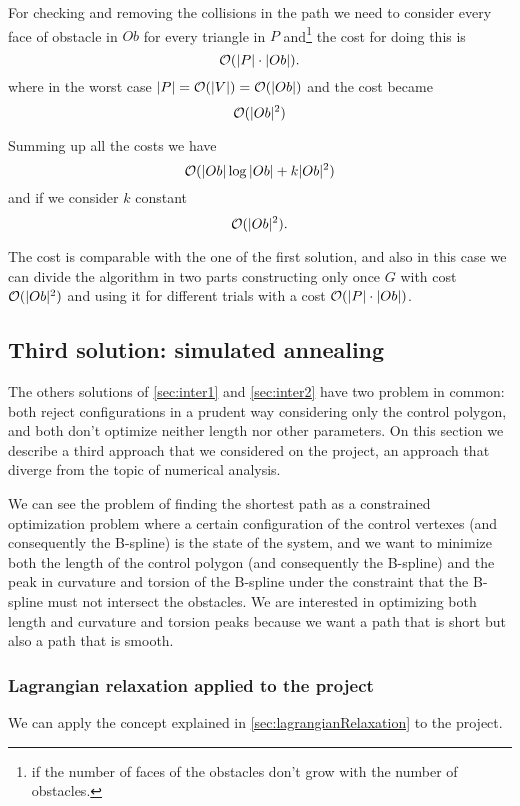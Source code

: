 \documentclass[dissertation.tex]{subfiles}
\begin{document}
For checking and removing the collisions in the path we need to
consider every face of obstacle in $Ob$ for every
triangle in $P$ and\footnote{if the
  number of faces of the obstacles don't grow with the number of
  obstacles.} the cost for doing this is
\begin{equation*}
  \mathcal{O}(|P|\cdot|Ob|).
\end{equation*}
where in the worst case $|P|=\mathcal{O}(|V|)=\mathcal{O}(|Ob|)$ and the cost
became
\begin{equation*}
  \mathcal{O}(|Ob|^2)
\end{equation*}

Summing up all the costs we have 
\begin{equation*}
  \mathcal{O}(|Ob|\log|Ob|+k|Ob|^2)
\end{equation*}
and if we consider $k$ constant
\begin{equation*}
  \mathcal{O}(|Ob|^2).
\end{equation*}

The cost is comparable with the one of the first solution, and also in
this case we can divide the algorithm in two parts constructing only
once $G$ with cost $\mathcal{O}(|Ob|^2)$ and using it for different
trials with a cost $\mathcal{O}(|P|\cdot|Ob|)$.

\subsection{Third solution: simulated annealing}\label{sec:inter3}
The others solutions of \cref{sec:inter1} and \cref{sec:inter2} have two
problem in common: both reject configurations in a prudent way
considering only the control polygon, and both don't optimize neither
length nor other parameters. On this section we describe a third
approach that we considered on the project, an approach that diverge
from the topic of numerical analysis.

We can see the problem of finding the shortest path as a constrained
optimization problem where a certain configuration of the control
vertexes (and
consequently the B-spline) is the state of the system, and we want to
minimize both the length of the control polygon (and consequently the
B-spline) and the peak in curvature and torsion of the B-spline under
the constraint that the B-spline must not intersect the obstacles. We
are interested in optimizing both length and curvature and torsion
peaks because we want a path that is short but also a path that is
smooth.

\subsubsection{Lagrangian relaxation applied to the project}
We can apply the concept explained in \cref{sec:lagrangianRelaxation}
to the project.
\end{document}
